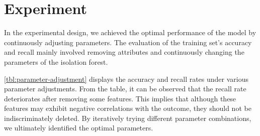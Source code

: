 \section{Experiment} \label{sec-experiment}
In the experimental design, we achieved the optimal performance of the model by continuously adjusting parameters. The evaluation of the training set's accuracy and recall mainly involved removing attributes and continuously changing the parameters of the isolation forest.

\begin{table}\centering
	
	\caption{parameter adjustment}
	\label{tbl:parameter-adjustment}
\end{table}

\cref{tbl:parameter-adjustment} displays the accuracy and recall rates under various parameter adjustments. From the table, it can be observed that the recall rate deteriorates after removing some features. This implies that although these features may exhibit negative correlations with the outcome, they should not be indiscriminately deleted. By iteratively trying different parameter combinations, we ultimately identified the optimal parameters.

